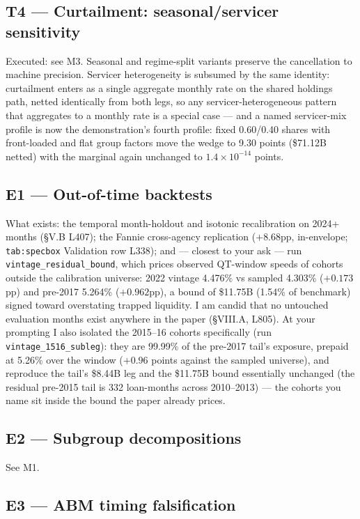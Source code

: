 \documentclass[11pt]{article}
\newcommand{\mlabel}[1]{\texttt{#1}}
\newcommand{\run}[1]{\texttt{#1}}
\begin{document}
\subsection*{T4 --- Curtailment: seasonal/servicer sensitivity}

Executed: see M3. Seasonal and regime-split variants preserve the cancellation
to machine precision. Servicer heterogeneity is subsumed by the same identity:
curtailment enters as a single aggregate monthly rate on the shared holdings
path, netted identically from both legs, so any servicer-heterogeneous pattern
that aggregates to a monthly rate is a special case --- and a named
servicer-mix profile is now the demonstration's fourth profile: fixed
0.60/0.40 shares with front-loaded and flat group factors move the wedge to
9.30 points (\$71.12B netted) with the marginal again unchanged to
$1.4\times10^{-14}$ points.

\subsection*{E1 --- Out-of-time backtests}

What exists: the temporal month-holdout and isotonic recalibration on 2024+
months (\S V.B L407); the Fannie cross-agency replication ($+8.68$pp,
in-envelope; \mlabel{tab:specbox} Validation row L338); and --- closest to
your ask --- run \run{vintage\_residual\_bound}, which prices observed
QT-window speeds of cohorts outside the calibration universe: 2022 vintage
4.476\% vs sampled 4.303\% ($+0.173$pp) and pre-2017 5.264\% ($+0.962$pp), a
bound of \$11.75B (1.54\% of benchmark) signed toward overstating trapped
liquidity. I am candid that no untouched evaluation months exist anywhere in
the paper (\S VIII.A, L805). At your prompting I also isolated the 2015--16
cohorts specifically (run \run{vintage\_1516\_subleg}): they are 99.99\% of
the pre-2017 tail's exposure, prepaid at 5.26\% over the window ($+0.96$ points
against the sampled universe), and reproduce the tail's \$8.44B leg and the
\$11.75B bound essentially unchanged (the residual pre-2015 tail is 332
loan-months across 2010--2013) --- the cohorts you name sit inside the bound
the paper already prices.

\subsection*{E2 --- Subgroup decompositions}

See M1.

\subsection*{E3 --- ABM timing falsification}
\end{document}
